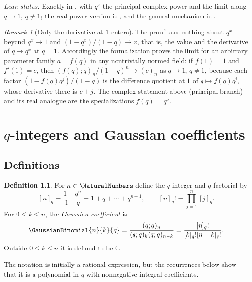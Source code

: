 \documentclass[11pt,a4paper,oneside,openany]{book}
\theoremstyle{definition}
\newtheorem{definition}[definition]{Definition}
\theoremstyle{remark}
\newtheorem{remark}[remark]{Remark}
\begin{document}
\emph{Lean status.}  Exactly  in
, with $q^x$ the principal complex power and the
limit along $q\to1$, $q\ne1$; the real-power version is
, and the general mechanism is
.


\begin{remark}[Only the derivative at $1$ enters]\label{rem:classical-limit-formalization}
The proof uses nothing about $q^x$ beyond $q^x\to1$ and
$(1-q^x)/(1-q)\to x$, that is, the value and the derivative of $q\mapsto q^x$
at $q=1$.  Accordingly the formalization proves the limit for an arbitrary
parameter family $a=f(q)$ in any nontrivially normed field: if $f(1)=1$ and
$f'(1)=c$, then $(f(q);q)_n/(1-q)^n\to(c)_n$ as $q\to1$, $q\ne1$, because
each factor $(1-f(q)q^j)/(1-q)$ is the difference quotient at $1$ of
$q\mapsto f(q)q^j$, whose derivative there is $c+j$.  The complex statement
above (principal branch) and its real analogue are the specializations
$f(q)=q^x$.
\end{remark}

\chapter{\texorpdfstring{$q$}{q}-integers and Gaussian coefficients}\label{chap:gaussian}

\section{Definitions}

\begin{definition}\label{qg:def-gaussian-coefficient}
For $n\in\NaturalNumbers$ define the $q$-integer and $q$-factorial by
\[
 [n]_q=\frac{1-q^n}{1-q}=1+q+\cdots+q^{n-1},
 \qquad
 [n]_q!=\prod_{j=1}^{n}[j]_q.
\]
For $0\le k\le n$, the \emph{Gaussian coefficient} is
\[
 \GaussianBinomial{n}{k}{q}
 =\frac{(q;q)_n}{(q;q)_k(q;q)_{n-k}}
 =\frac{[n]_q!}{[k]_q![n-k]_q!}.
\]
Outside $0\le k\le n$ it is defined to be $0$.
\end{definition}

The notation is initially a rational expression, but the recurrences below show that it is a polynomial in $q$ with nonnegative integral coefficients.
\end{document}
